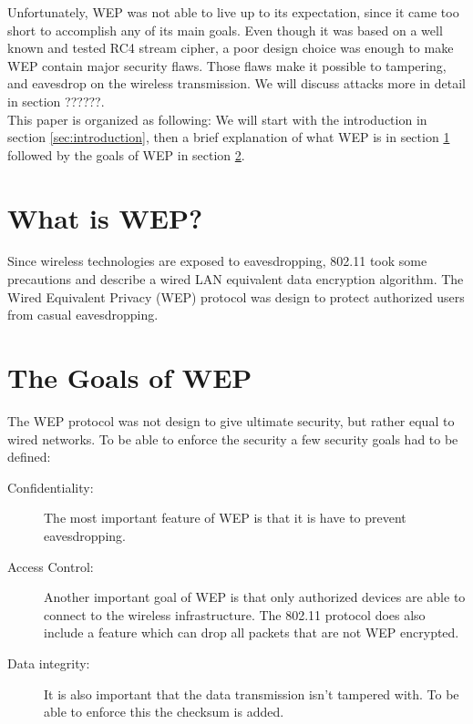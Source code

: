 \documentclass[twocolumn,11pt]{IEEEtran}
\begin{document}
Unfortunately, WEP was not able to live up to its expectation, since it came too short to accomplish any of its main goals. Even though it was based on a well known and tested RC4 stream cipher, a poor design choice was enough to make WEP contain major security flaws. Those flaws make it possible to tampering, and eavesdrop on the wireless transmission. We will discuss attacks more in detail in section ??????. \\



This paper is organized as following: We will start with the introduction in 
section \ref{sec:introduction}, then a brief explanation of what WEP is in 
section \ref{sec:whatiswep} followed by the goals of WEP in section \ref{sec:goals}.


\section {What is WEP?}
\label{sec:whatiswep}

Since wireless technologies are exposed to eavesdropping, 802.11 took some precautions and describe a wired LAN equivalent data encryption algorithm. The Wired Equivalent Privacy (WEP) protocol was design to protect authorized users from casual eavesdropping.  



\section {The Goals of WEP}
\label{sec:goals}

The WEP protocol was not design to give ultimate security, but rather equal to wired networks. To be able to enforce the security a few security goals had to be defined\cite{IEEE:Fast}:\\

\begin{description}
\item[Confidentiality:] The most important feature of WEP is that it is have to prevent eavesdropping.
\item[Access Control:] Another important goal of WEP is that only authorized devices are able to connect to the wireless infrastructure. The 802.11 protocol does also include a feature which can drop all packets that are not WEP encrypted.
\item[Data integrity:] It is also important that the data transmission isn't tampered with. To be able to enforce this the checksum is added.\\
\end{description}
\end{document}
